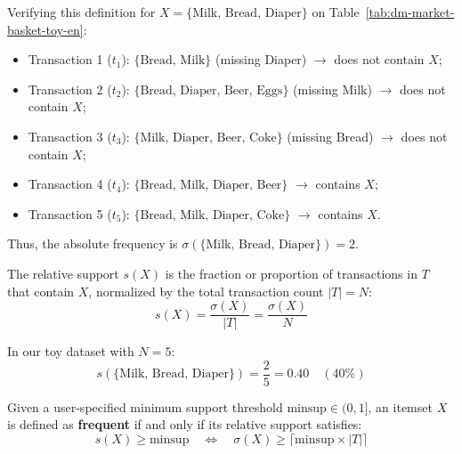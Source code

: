 Verifying this definition for $X = \{\text{Milk, Bread, Diaper}\}$ on Table~\ref{tab:dm-market-basket-toy-en}:
\begin{itemize}[noitemsep]
    \item Transaction 1 ($t_1$): $\{\text{Bread, Milk}\}$ (missing Diaper) $\rightarrow$ does not contain $X$;
    \item Transaction 2 ($t_2$): $\{\text{Bread, Diaper, Beer, Eggs}\}$ (missing Milk) $\rightarrow$ does not contain $X$;
    \item Transaction 3 ($t_3$): $\{\text{Milk, Diaper, Beer, Coke}\}$ (missing Bread) $\rightarrow$ does not contain $X$;
    \item Transaction 4 ($t_4$): $\{\text{Bread, Milk, Diaper, Beer}\}$ $\rightarrow$ contains $X$;
    \item Transaction 5 ($t_5$): $\{\text{Bread, Milk, Diaper, Coke}\}$ $\rightarrow$ contains $X$.
\end{itemize}
Thus, the absolute frequency is $\sigma(\{\text{Milk, Bread, Diaper}\}) = 2$.

\begin{definition}
The relative support $s(X)$ is the fraction or proportion of transactions in $T$ that contain $X$, normalized by the total transaction count $|T| = N$:
\begin{equation}
\label{eq:dm-relative-support-en}
s(X) = \frac{\sigma(X)}{|T|} = \frac{\sigma(X)}{N}
\end{equation}
\end{definition}

In our toy dataset with $N = 5$:
\begin{equation}
s(\{\text{Milk, Bread, Diaper}\}) = \frac{2}{5} = 0.40 \quad (40\%)
\end{equation}

\begin{definition}
Given a user-specified minimum support threshold $\mathrm{minsup} \in (0, 1]$, an itemset $X$ is defined as \textbf{frequent} if and only if its relative support satisfies:
\begin{equation}
\label{eq:dm-frequent-itemset-def-en}
s(X) \ge \mathrm{minsup} \quad \Longleftrightarrow \quad \sigma(X) \ge \lceil \mathrm{minsup} \times |T| \rceil
\end{equation}
\end{definition}

